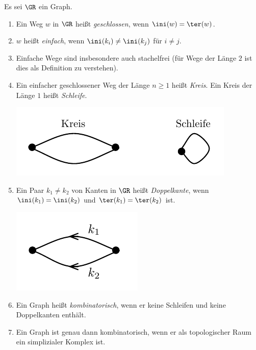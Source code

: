 \DB Es sei $\GR$ ein Graph.
\begin{enumerate}
\item Ein Weg $w$ in $\GR$ heißt \emph{geschlossen},
wenn $\ini(w)=\ter(w)$.
\item $w$ heißt \emph{einfach},
wenn $\ini(k_i)\neq\ini(k_j)$ für $i\neq j$.
\item Einfache Wege sind insbesondere auch stachelfrei (für Wege
der Länge $2$ ist dies als Definition zu verstehen).
\item Ein einfacher geschlossener Weg der Länge $n\geq 1$ heißt
\emph{Kreis}.
Ein Kreis der Länge $1$ heißt \emph{Schleife}.
\begin{center}
	\includegraphics{grugraImages/kreis}
\end{center}
\item Ein Paar $k_1\neq k_2$ von Kanten in $\GR$ heißt \emph{Doppelkante},
wenn $\ini(k_1)=\ini(k_2)$ und $\ter(k_1)=\ter(k_2)$ ist.
\begin{center}
	\includegraphics{grugraImages/doppelkante}
\end{center}
\item Ein Graph heißt \emph{kombinatorisch},
wenn er keine Schleifen und keine Doppelkanten enthält.
\item Ein Graph ist genau dann kombinatorisch, wenn er als
topologischer Raum ein simplizialer Komplex ist.
\end{enumerate}


